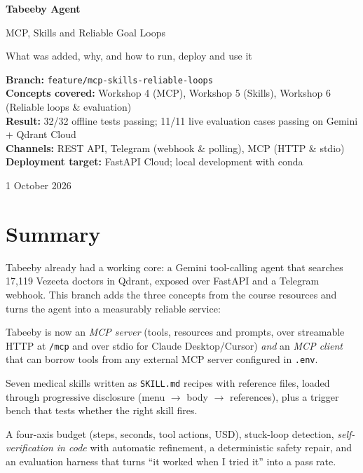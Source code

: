 \documentclass[11pt,a4paper]{article}
\newcommand{\code}[1]{\texttt{#1}}
\begin{document}
\begin{titlepage}
  \centering
  \vspace*{3cm}
  {\Huge\bfseries\color{brand} Tabeeby Agent\par}
  \vspace{0.4cm}
  {\Large MCP, Skills and Reliable Goal Loops\par}
  \vspace{0.3cm}
  {\large What was added, why, and how to run, deploy and use it\par}
  \vspace{1.5cm}
  \begin{tcolorbox}[colback=soft,colframe=brand,width=0.82\textwidth,arc=2pt]
  \small
  \textbf{Branch:} \code{feature/mcp-skills-reliable-loops}\\[2pt]
  \textbf{Concepts covered:} Workshop 4 (MCP), Workshop 5 (Skills), Workshop 6 (Reliable loops \& evaluation)\\[2pt]
  \textbf{Result:} 32/32 offline tests passing; 11/11 live evaluation cases passing on Gemini + Qdrant Cloud\\[2pt]
  \textbf{Channels:} REST API, Telegram (webhook \& polling), MCP (HTTP \& stdio)\\[2pt]
  \textbf{Deployment target:} FastAPI Cloud; local development with conda
  \end{tcolorbox}
  \vfill
  {\small 1 October 2026}
\end{titlepage}

\tableofcontents
\newpage

\section{Summary}

Tabeeby already had a working core: a Gemini tool-calling agent that searches 17{,}119 Vezeeta doctors in Qdrant, exposed over FastAPI and a Telegram webhook. This branch adds the three concepts from the course resources and turns the agent into a measurably reliable service:

\begin{description}[leftmargin=1.2em]
  \item[MCP (Workshop 4)] Tabeeby is now an \emph{MCP server} (tools, resources and prompts, over streamable HTTP at \code{/mcp} and over stdio for Claude Desktop/Cursor) \emph{and} an \emph{MCP client} that can borrow tools from any external MCP server configured in \code{.env}.
  \item[Skills (Workshop 5)] Seven medical skills written as \code{SKILL.md} recipes with reference files, loaded through progressive disclosure (menu $\rightarrow$ body $\rightarrow$ references), plus a trigger bench that tests whether the right skill fires.
  \item[Reliable loops (Workshop 6)] A four-axis budget (steps, seconds, tool actions, USD), stuck-loop detection, \emph{self-verification in code} with automatic refinement, a deterministic safety repair, and an evaluation harness that turns ``it worked when I tried it'' into a pass rate.
\end{description}
\end{document}
